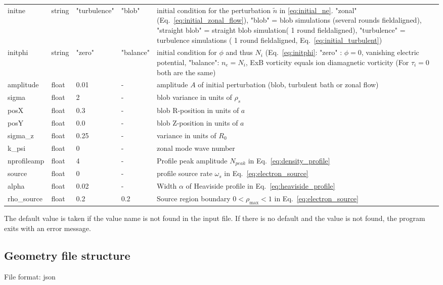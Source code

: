 \begin{longtable}{llll>{\RaggedRight}p{6cm}}
initne    & string & "turbulence"     & "blob"  & initial condition for the
perturbation $\tilde n$ in \eqref{eq:initial_ne}. "zonal" (Eq.~\eqref{eq:initial_zonal_flow}),
    "blob" = blob simulations (several rounds fieldaligned),
    "straight blob" = straight blob simulation( 1 round fieldaligned),
    "turbulence" = turbulence simulations ( 1 round fieldaligned, Eq.~\eqref{eq:initial_turbulent})\\
initphi   & string & "zero"  & "balance" & initial condition for $\phi$ and thus $N_i$ (Eq.~\eqref{eq:initphi}: "zero" : $\phi = 0$, vanishing
electric potential, "balance": $n_e=N_i$, ExB vorticity equals ion diamagnetic vorticity (For $\tau_i =0 $ both are the same)
\\
amplitude  & float &0.01   & - & amplitude $A$ of initial perturbation (blob, turbulent bath or zonal flow)  \\
sigma      & float &2      & - & blob variance in units of $\rho_s$ \\
posX       & float &0.3    & - & blob R-position in units of $a$\\
posY       & float &0.0    & - & blob Z-position in units of $a$ \\
sigma\_z    & float &0.25   & - & variance in units of $R_0$  \\
k\_psi     & float &0    & - & zonal mode wave number  \\
nprofileamp& float &4   & - & Profile peak amplitude $N_{peak}$ in Eq.~\eqref{eq:density_profile} \\
source  & float & 0     & - & profile source rate $\omega_s$ in Eq.~\eqref{eq:electron_source} \\
alpha     & float  & 0.02 & - & Width $\alpha$ of Heaviside profile in Eq.~\eqref{eq:heaviside_profile} \\
rho\_source & float  & 0.2   & 0.2 & Source region boundary $0<\rho_{\max}<1$ in Eq.~\eqref{eq:electron_source}  \\
\bottomrule
\end{longtable}
The default value is taken if the value name is not found in the input file. If there is no default and
the value is not found,
the program exits with an error message.
\subsection{Geometry file structure}
File format: json

